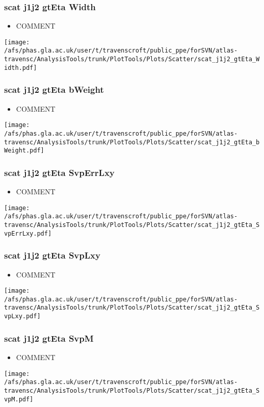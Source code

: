 \documentclass{beamer}
\begin{document}
\begin{frame}
\frametitle{scat j1j2 gtEta Width}
\begin{itemize}
\item COMMENT
\end{itemize}
\begin{center}
\texttt{[image: /afs/phas.gla.ac.uk/user/t/travenscroft/public\_ppe/forSVN/atlas-travensc/AnalysisTools/trunk/PlotTools/Plots/Scatter/scat\_j1j2\_gtEta\_Width.pdf]}
\end{center}
\end{frame}

\begin{frame}
\frametitle{scat j1j2 gtEta bWeight}
\begin{itemize}
\item COMMENT
\end{itemize}
\begin{center}
\texttt{[image: /afs/phas.gla.ac.uk/user/t/travenscroft/public\_ppe/forSVN/atlas-travensc/AnalysisTools/trunk/PlotTools/Plots/Scatter/scat\_j1j2\_gtEta\_bWeight.pdf]}
\end{center}
\end{frame}

\begin{frame}
\frametitle{scat j1j2 gtEta SvpErrLxy}
\begin{itemize}
\item COMMENT
\end{itemize}
\begin{center}
\texttt{[image: /afs/phas.gla.ac.uk/user/t/travenscroft/public\_ppe/forSVN/atlas-travensc/AnalysisTools/trunk/PlotTools/Plots/Scatter/scat\_j1j2\_gtEta\_SvpErrLxy.pdf]}
\end{center}
\end{frame}

\begin{frame}
\frametitle{scat j1j2 gtEta SvpLxy}
\begin{itemize}
\item COMMENT
\end{itemize}
\begin{center}
\texttt{[image: /afs/phas.gla.ac.uk/user/t/travenscroft/public\_ppe/forSVN/atlas-travensc/AnalysisTools/trunk/PlotTools/Plots/Scatter/scat\_j1j2\_gtEta\_SvpLxy.pdf]}
\end{center}
\end{frame}

\begin{frame}
\frametitle{scat j1j2 gtEta SvpM}
\begin{itemize}
\item COMMENT
\end{itemize}
\begin{center}
\texttt{[image: /afs/phas.gla.ac.uk/user/t/travenscroft/public\_ppe/forSVN/atlas-travensc/AnalysisTools/trunk/PlotTools/Plots/Scatter/scat\_j1j2\_gtEta\_SvpM.pdf]}
\end{center}
\end{frame}
\end{document}
